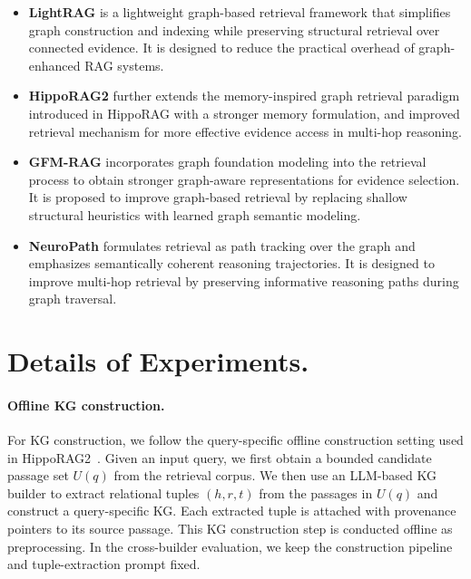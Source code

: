 \documentclass{article}
\theoremstyle{plain}
\theoremstyle{definition}
\theoremstyle{remark}
\begin{document}
\begin{itemize}

\item \textbf{LightRAG} is a lightweight graph-based retrieval framework that simplifies graph construction and indexing while preserving structural retrieval over connected evidence. It is designed to reduce the practical overhead of graph-enhanced RAG systems.

\item  \textbf{HippoRAG2} further extends the memory-inspired graph retrieval paradigm introduced in HippoRAG with a stronger memory formulation, and improved retrieval mechanism for more effective evidence access in multi-hop reasoning.

\item \textbf{GFM-RAG} incorporates graph foundation modeling into the retrieval process to obtain stronger graph-aware representations for evidence selection. It is proposed to improve graph-based retrieval by replacing shallow structural heuristics with learned graph semantic modeling.

\item \textbf{NeuroPath} formulates retrieval as path tracking over the graph and emphasizes semantically coherent reasoning trajectories. It is designed to improve multi-hop retrieval by preserving informative reasoning paths during graph traversal.
\end{itemize}

\section{Details of Experiments.}
\paragraph{Offline KG construction.}
For KG construction, we follow the query-specific offline construction setting used in HippoRAG2~\cite{hipporag2}. Given an input query, we first obtain a bounded candidate passage set $U(q)$ from the retrieval corpus. We then use an LLM-based KG builder to extract relational tuples $(h,r,t)$ from the passages in $U(q)$ and construct a query-specific KG. Each extracted tuple is attached with provenance pointers to its source passage. This KG construction step is conducted offline as preprocessing. In the cross-builder evaluation, we keep the construction pipeline and tuple-extraction prompt fixed.
\end{document}
